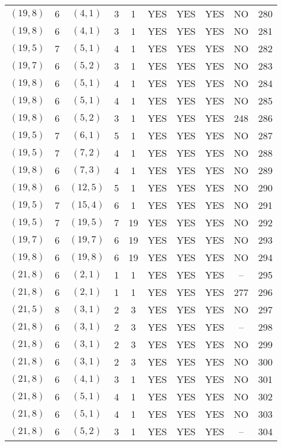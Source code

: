 \begin{longtable}{|c|c|c|c|c|c|c|c|c|c|}
$(19, 8)$ & 6 & $(4, 1)$ & 3 & 1 & YES & YES & YES & NO & 280\\
$(19, 8)$ & 6 & $(4, 1)$ & 3 & 1 & YES & YES & YES & NO & 281\\
$(19, 5)$ & 7 & $(5, 1)$ & 4 & 1 & YES & YES & YES & NO & 282\\
$(19, 7)$ & 6 & $(5, 2)$ & 3 & 1 & YES & YES & YES & NO & 283\\
$(19, 8)$ & 6 & $(5, 1)$ & 4 & 1 & YES & YES & YES & NO & 284\\
$(19, 8)$ & 6 & $(5, 1)$ & 4 & 1 & YES & YES & YES & NO & 285\\
$(19, 8)$ & 6 & $(5, 2)$ & 3 & 1 & YES & YES & YES & 248 & 286\\
$(19, 5)$ & 7 & $(6, 1)$ & 5 & 1 & YES & YES & YES & NO & 287\\
$(19, 5)$ & 7 & $(7, 2)$ & 4 & 1 & YES & YES & YES & NO & 288\\
$(19, 8)$ & 6 & $(7, 3)$ & 4 & 1 & YES & YES & YES & NO & 289\\
$(19, 8)$ & 6 & $(12, 5)$ & 5 & 1 & YES & YES & YES & NO & 290\\
$(19, 5)$ & 7 & $(15, 4)$ & 6 & 1 & YES & YES & YES & NO & 291\\
$(19, 5)$ & 7 & $(19, 5)$ & 7 & 19 & YES & YES & YES & NO & 292\\
$(19, 7)$ & 6 & $(19, 7)$ & 6 & 19 & YES & YES & YES & NO & 293\\
$(19, 8)$ & 6 & $(19, 8)$ & 6 & 19 & YES & YES & YES & NO & 294\\
$(21, 8)$ & 6 & $(2, 1)$ & 1 & 1 & YES & YES & YES & -- & 295\\
$(21, 8)$ & 6 & $(2, 1)$ & 1 & 1 & YES & YES & YES & 277 & 296\\
$(21, 5)$ & 8 & $(3, 1)$ & 2 & 3 & YES & YES & YES & NO & 297\\
$(21, 8)$ & 6 & $(3, 1)$ & 2 & 3 & YES & YES & YES & -- & 298\\
$(21, 8)$ & 6 & $(3, 1)$ & 2 & 3 & YES & YES & YES & NO & 299\\
$(21, 8)$ & 6 & $(3, 1)$ & 2 & 3 & YES & YES & YES & NO & 300\\
$(21, 8)$ & 6 & $(4, 1)$ & 3 & 1 & YES & YES & YES & NO & 301\\
$(21, 8)$ & 6 & $(5, 1)$ & 4 & 1 & YES & YES & YES & NO & 302\\
$(21, 8)$ & 6 & $(5, 1)$ & 4 & 1 & YES & YES & YES & NO & 303\\
$(21, 8)$ & 6 & $(5, 2)$ & 3 & 1 & YES & YES & YES & -- & 304\\

\end{longtable}

